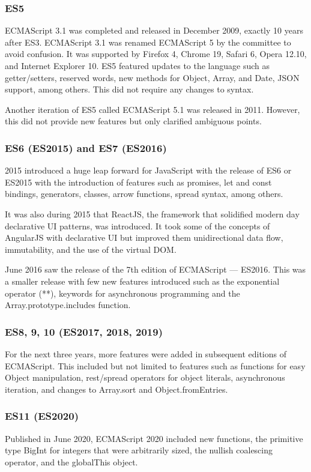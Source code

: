 \documentclass{article}
\begin{document}
  \subsubsection{ES5}
  ECMAScript 3.1 was completed and released in December 2009, exactly 10 years
  after ES3. ECMAScript 3.1 was renamed ECMAScript 5 by the committee to avoid
  confusion. It was supported by Firefox 4, Chrome 19, Safari 6, Opera 12.10,
  and Internet Explorer 10. ES5 featured updates to the language such as
  getter/setters, reserved words, new methods for Object, Array, and Date, JSON
  support, among others. This did not require any changes to syntax.

  Another iteration of ES5 called ECMAScript 5.1 was released in 2011. However,
  this did not provide new features but only clarified ambiguous points.

  \subsubsection{ES6 (ES2015) and ES7 (ES2016)}
  2015 introduced a huge leap forward for JavaScript with the release of ES6 or
  ES2015 with the introduction of features such as promises, let and const
  bindings, generators, classes, arrow functions, spread syntax, among others.

  It was also during 2015 that ReactJS, the framework that solidified modern day
  declarative UI patterns, was introduced. It took some of the concepts of
  AngularJS with declarative UI but improved them unidirectional data flow,
  immutability, and the use of the virtual DOM.\@

  June 2016 saw the release of the 7th edition of ECMAScript --- ES2016. This
  was a smaller release with few new features introduced such as the exponential
  operator (**), keywords for asynchronous programming and the
  Array.prototype.includes function.

  \subsubsection{ES8, 9, 10 (ES2017, 2018, 2019)}
  For the next three years, more features were added in subsequent editions of
  ECMAScript. This included but not limited to features such as functions for
  easy Object manipulation, rest/spread operators for object literals,
  asynchronous iteration, and changes to Array.sort and Object.fromEntries.

  \subsubsection{ES11 (ES2020)}
  Published in June 2020, ECMAScript 2020 included new functions, the primitive
  type BigInt for integers that were arbitrarily sized, the nullish coalescing
  operator, and the globalThis object.
\end{document}

